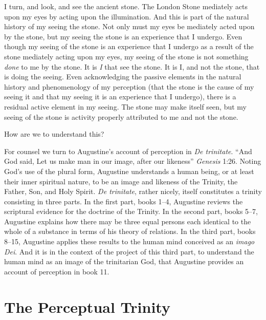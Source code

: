 \documentclass[12pt]{article}
\begin{document}
I turn, and look, and see the ancient stone. The London Stone mediately acts upon my eyes by acting upon the illumination. And this is part of the natural history of my seeing the stone. Not only must my eyes be mediately acted upon by the stone, but my seeing the stone is an experience that I undergo. Even though my seeing of the stone is an experience that I undergo as a result of the stone mediately acting upon my eyes, my seeing of the stone is not something \emph{done} to me by the stone. It is \emph{I} that see the stone. It is I, and not the stone, that is doing the seeing. Even acknowledging the passive elements in the natural history and phenomenology of my perception (that the stone is the cause of my seeing it and that my seeing it is an experience that I undergo), there is a residual active element in my seeing. The stone may make itself seen, but my seeing of the stone is activity properly attributed to me and not the stone.

How are we to understand this?

For counsel we turn to Augustine's account of perception in \emph{De trinitate}. ``And God said, Let us make man in our image, after our likeness'' \emph{Genesis} 1:26. Noting God's use of the plural form, Augustine understands a human being, or at least their inner spiritual nature, to be an image and likeness of the Trinity, the Father, Son, and Holy Spirit. \emph{De trinitate}, rather nicely, itself constitutes a trinity consisting in three parts. In the first part, books 1--4, Augustine reviews the scriptural evidence for the doctrine of the Trinity. In the second part, books 5--7, Augustine explains how there may be three equal persons each identical to the whole of a substance in terms of his theory of relations. In the third part, books 8--15, Augustine applies these results to the human mind conceived as an \emph{imago Dei}. And it is in the context of the project of this third part, to understand the human mind as an image of the trinitarian God, that Augustine provides an account of perception in book 11.


\section{The Perceptual Trinity} %
\label{sec:the_perceptual_trinity}
\end{document}
